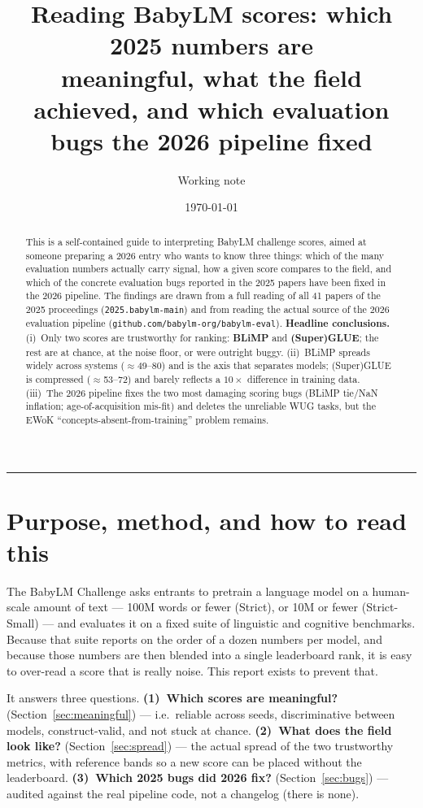 \documentclass[11pt]{article}
\title{\vspace{-3.5em}\textbf{Reading BabyLM scores: which 2025 numbers are\\
meaningful, what the field achieved, and which evaluation\\
bugs the 2026 pipeline fixed}}
\author{Working note}
\date{\today}
\begin{document}
\maketitle
\vspace{-2.4em}

\begin{abstract}
\noindent This is a self-contained guide to interpreting BabyLM challenge scores, aimed
at someone preparing a 2026 entry who wants to know three things: which of the many
evaluation numbers actually carry signal, how a given score compares to the field, and
which of the concrete evaluation bugs reported in the 2025 papers have been fixed in the
2026 pipeline. The findings are drawn from a full reading of all 41 papers of the 2025
proceedings (\texttt{2025.babylm-main}) and from reading the actual source of the 2026
evaluation pipeline (\texttt{github.com/babylm-org/babylm-eval}). \textbf{Headline
conclusions.} (i)~Only two scores are trustworthy for ranking: \textbf{BLiMP} and
\textbf{(Super)GLUE}; the rest are at chance, at the noise floor, or were outright buggy.
(ii)~BLiMP spreads widely across systems ($\approx$49--80) and is the axis that separates
models; (Super)GLUE is compressed ($\approx$53--72) and barely reflects a $10\times$
difference in training data. (iii)~The 2026 pipeline fixes the two most damaging scoring
bugs (BLiMP tie/NaN inflation; age-of-acquisition mis-fit) and deletes the unreliable WUG
tasks, but the EWoK ``concepts-absent-from-training'' problem remains.
\end{abstract}

\tableofcontents
\vspace{0.6em}
\hrule

\section{Purpose, method, and how to read this}
\label{sec:intro}
The BabyLM Challenge asks entrants to pretrain a language model on a human-scale amount of
text --- 100M words or fewer (Strict), or 10M or fewer (Strict-Small) --- and evaluates it
on a fixed suite of linguistic and cognitive benchmarks. Because that suite reports on the
order of a dozen numbers per model, and because those numbers are then blended into a single
leaderboard rank, it is easy to over-read a score that is really noise. This report exists to
prevent that.

It answers three questions. \textbf{(1)~Which scores are meaningful?}
(Section~\ref{sec:meaningful}) --- i.e.\ reliable across seeds, discriminative between
models, construct-valid, and not stuck at chance. \textbf{(2)~What does the field look like?}
(Section~\ref{sec:spread}) --- the actual spread of the two trustworthy metrics, with
reference bands so a new score can be placed without the leaderboard.
\textbf{(3)~Which 2025 bugs did 2026 fix?} (Section~\ref{sec:bugs}) --- audited against the
real pipeline code, not a changelog (there is none).
\end{document}
